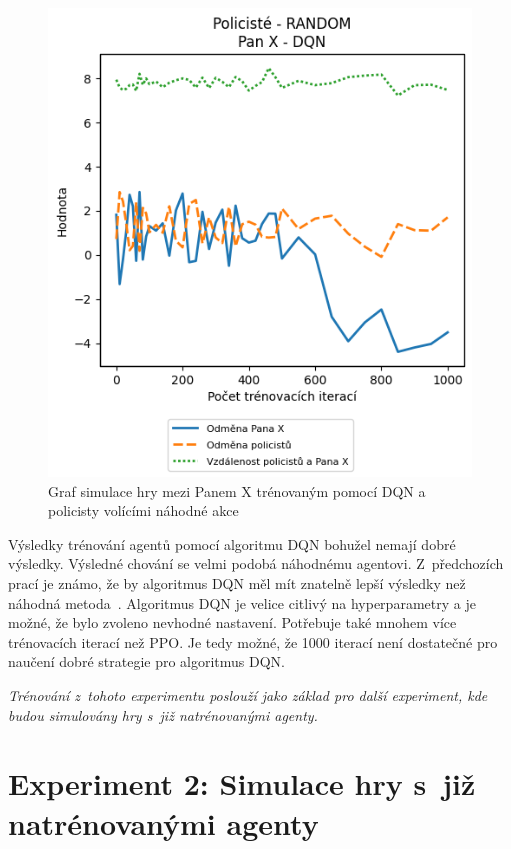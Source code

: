 \begin{figure}[H]
\begin{minipage}{.48\textwidth}
    \includegraphics[width=1\textwidth]{obrazky-figures/graphs/cop_RANDOM_mrx_DQN}
      \caption{Graf simulace hry mezi Panem X trénovaným pomocí DQN a policisty volícími náhodné akce}
      \label{fig:cop_random_mrx_dqn}
  \end{minipage}
  \label{fig:srovnani_dqn}
  \end{figure}

Výsledky trénování agentů pomocí algoritmu DQN bohužel nemají dobré výsledky.
Výsledné chování se velmi podobá náhodnému agentovi.
Z~předchozích prací je známo, že by algoritmus DQN měl mít znatelně lepší výsledky než náhodná metoda~\cite{Hrklova2023thesis}.
Algoritmus DQN je velice citlivý na hyperparametry a je možné, že bylo zvoleno nevhodné nastavení.
Potřebuje také mnohem více trénovacích iterací než PPO\@.
Je tedy možné, že 1000 iterací není dostatečné pro naučení dobré strategie pro algoritmus DQN\@.

\emph{Trénování z~tohoto experimentu poslouží jako základ pro další experiment, kde budou simulovány hry s~již natrénovanými agenty.}

\section{Experiment 2: Simulace hry s~již natrénovanými agenty}
\label{sec:experiment-2}

